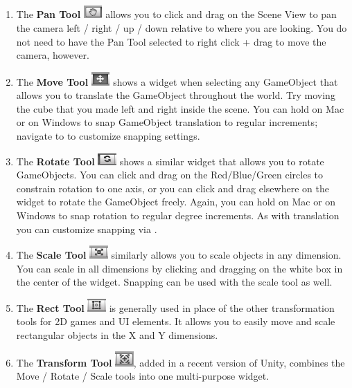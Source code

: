 \documentclass[11pt]{article}
\begin{document}
\begin{enumerate}
    \item The \textbf{Pan Tool} \includegraphics[width=20pt]{tool_pan.png} allows you to click and drag on the Scene View to pan the camera left / right / up / down relative to where you are looking.  You do not need to have the Pan Tool selected to right click + drag to move the camera, however.
    \item The \textbf{Move Tool} \includegraphics[width=20pt]{tool_move.png} shows a widget when selecting any GameObject that allows you to translate the GameObject throughout the world.  Try moving the cube that you made left and right inside the scene.  You can hold  on Mac or \keys{\ctrl} on Windows to snap GameObject translation to regular increments; navigate to  to customize snapping settings.
    \item The \textbf{Rotate Tool} \includegraphics[width=20pt]{tool_rot.png} shows a similar widget that allows you to rotate GameObjects.  You can click and drag on the Red/Blue/Green circles to constrain rotation to one axis, or you can click and drag elsewhere on the widget to rotate the GameObject freely.  Again, you can hold  on Mac or \keys{\ctrl} on Windows to snap rotation to regular degree increments.  As with translation you can customize snapping via .
    \item The \textbf{Scale Tool} \includegraphics[width=20pt]{tool_scale.png} similarly allows you to scale objects in any dimension.  You can scale in all dimensions by clicking and dragging on the white box in the center of the widget.  Snapping can be used with the scale tool as well.
    \item The \textbf{Rect Tool} \includegraphics[width=20pt]{tool_rect.png} is generally used in place of the other transformation tools for 2D games and UI elements.  It allows you to easily move and scale rectangular objects in the X and Y dimensions.
    \item The \textbf{Transform Tool} \includegraphics[width=20pt]{tool_trans.png}, added in a recent version of Unity, combines the Move / Rotate / Scale tools into one multi-purpose widget.
\end{enumerate}
\end{document}
